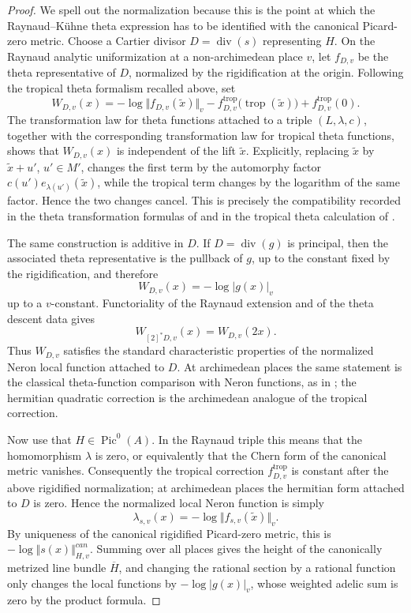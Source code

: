 \documentclass[10pt,a4paper]{amsart}
\theoremstyle{plain}
\theoremstyle{plain}
\numberwithin{equation}{section}
\begin{document}
\begin{proof}
	We spell out the normalization because this is the point at which the
	Raynaud--K\"uhne theta expression has to be identified with the canonical
	Picard-zero metric.  Choose a Cartier divisor \(D=\operatorname{div}(s)\)
	representing \(H\).  On the Raynaud analytic uniformization at a
	non-archimedean place \(v\), let \(f_{D,v}\) be the theta representative of
	\(D\), normalized by the rigidification at the origin.  Following the tropical
	theta formalism recalled above, set
	\[
	W_{D,v}(x)
	=
	-\log\Vert f_{D,v}(\widetilde x)\Vert_v
	-f_{D,v}^{\operatorname{trop}}
	\bigl(\operatorname{trop}(\widetilde x)\bigr)
	+f_{D,v}^{\operatorname{trop}}(0).
	\]
	The transformation law for theta functions attached to a triple
	\((L,\lambda,c)\), together with the corresponding transformation law for
	tropical theta functions, shows that \(W_{D,v}(x)\) is independent of the lift
	\(\widetilde x\).  Explicitly, replacing \(\widetilde x\) by
	\(\widetilde x+u'\), \(u'\in M'\), changes the first term by the automorphy
	factor \(c(u')e_{\lambda(u')}(\widetilde x)\), while the tropical term changes
	by the logarithm of the same factor.  Hence the two changes cancel.  This is
	precisely the compatibility recorded in the theta transformation formulas of
	\cite[Section~3]{FRSS} and in the tropical theta calculation of
	\cite[Section~4]{TJFA}.
	
	The same construction is additive in \(D\).  If \(D=\operatorname{div}(g)\) is
	principal, then the associated theta representative is the pullback of \(g\),
	up to the constant fixed by the rigidification, and therefore
	\[
	W_{D,v}(x)=-\log |g(x)|_v
	\]
	up to a \(v\)-constant.  Functoriality of the Raynaud extension and of the
	theta descent data gives
	\[
	W_{[2]^*D,v}(x)=W_{D,v}(2x).
	\]
	Thus \(W_{D,v}\) satisfies the standard characteristic properties of the
	normalized Neron local function attached to \(D\).  At archimedean places the
	same statement is the classical theta-function comparison with Neron
	functions, as in \cite[Chapter~13, Theorem~1.1]{Lang}; the hermitian
	quadratic correction is the archimedean analogue of the tropical correction.
	
	Now use that \(H\in\operatorname{Pic}^0(A)\).  In the Raynaud triple this means
	that the homomorphism \(\lambda\) is zero, or equivalently that the Chern form
	of the canonical metric vanishes.  Consequently the tropical correction
	\(f_{D,v}^{\operatorname{trop}}\) is constant after the above rigidified
	normalization; at archimedean places the hermitian form attached to \(D\) is
	zero.  Hence the normalized local Neron function is simply
	\[
	\lambda_{s,v}(x)
	=-\log\Vert f_{s,v}(\widetilde x)\Vert_v .
	\]
	By uniqueness of the canonical rigidified Picard-zero metric, this is
	\(-\log\Vert s(x)\Vert^{can}_{H,v}\).  Summing over all places gives the
	height of the canonically metrized line bundle \(\overline H\), and changing
	the rational section by a rational function only changes the local functions
	by \(-\log|g(x)|_v\), whose weighted adelic sum is zero by the product formula.
\end{proof}
\end{document}
